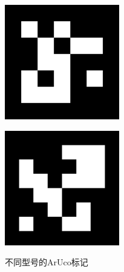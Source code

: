 \begin{figure}[htb]
\begin{minipage}[t]{0.33\linewidth}
		\includegraphics[width=\columnwidth]{figures/2-15b.png} 
		\label{fig:2-15b} 
	\end{minipage}
	\begin{minipage}[t]{0.33\linewidth} 
		\centering
		\includegraphics[width=\columnwidth]{figures/2-15c.png} 
		\label{fig:2-15c} 
	\end{minipage}
	\caption{不同型号的ArUco标记}
	\label{fig:2-15}
\end{figure}

